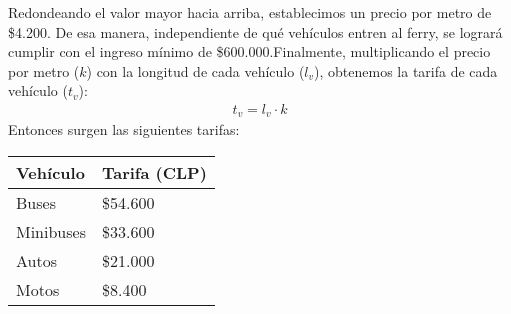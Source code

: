\documentclass[a4paper]{article}
\begin{document}
Redondeando el valor mayor hacia arriba, establecimos un precio por metro de \$4.200. De esa manera, independiente de qué vehículos entren al ferry, se logrará cumplir con el ingreso mínimo de \$600.000.\newline\newline Finalmente, multiplicando el precio por metro ($k$) con la longitud de cada vehículo ($l_{v}$), obtenemos la tarifa de cada vehículo ($t_{v}$): 
\begin{align*}
    t_{v}=l_{v}\cdot k
\end{align*}
Entonces surgen las siguientes tarifas:
\begin{table}[h]
    \centering
    \begin{tabular}{|M{4cm}|M{4cm}|}
        \hline
        Vehículo & Tarifa (CLP)\\
         \hline
        Buses & \$54.600 \\
        \hline
         Minibuses & \$33.600 \\
         \hline
         Autos & \$21.000 \\
         \hline
         Motos & \$8.400 \\
         \hline
    \end{tabular}
\end{table}
\newline
\end{document}
